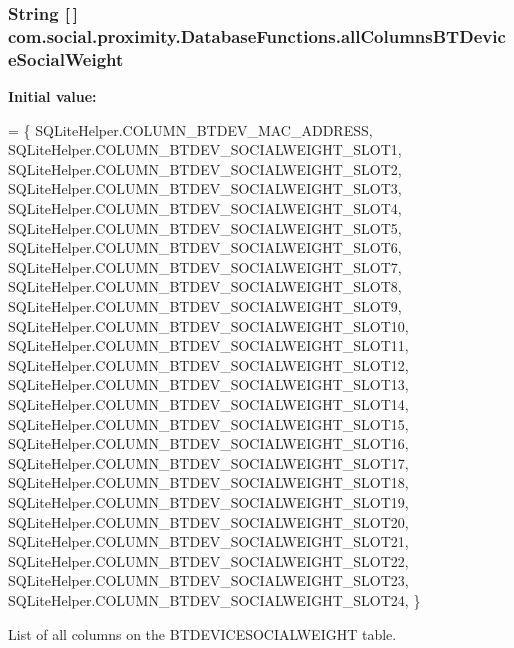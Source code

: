 \subsubsection[{all\+Columns\+B\+T\+Device\+Social\+Weight}]{\setlength{\rightskip}{0pt plus 5cm}String \mbox{[}$\,$\mbox{]} com.\+social.\+proximity.\+Database\+Functions.\+all\+Columns\+B\+T\+Device\+Social\+Weight\hspace{0.3cm}{\ttfamily [private]}}\label{classcom_1_1social_1_1proximity_1_1_database_functions_a5cb0795326bc5712e498557e68a2f3e7}
{\bfseries Initial value\+:}
\begin{DoxyCode}
= \{ 
            SQLiteHelper.COLUMN\_BTDEV\_MAC\_ADDRESS,
            SQLiteHelper.COLUMN\_BTDEV\_SOCIALWEIGHT\_SLOT1,
            SQLiteHelper.COLUMN\_BTDEV\_SOCIALWEIGHT\_SLOT2,
            SQLiteHelper.COLUMN\_BTDEV\_SOCIALWEIGHT\_SLOT3,
            SQLiteHelper.COLUMN\_BTDEV\_SOCIALWEIGHT\_SLOT4,
            SQLiteHelper.COLUMN\_BTDEV\_SOCIALWEIGHT\_SLOT5,
            SQLiteHelper.COLUMN\_BTDEV\_SOCIALWEIGHT\_SLOT6,
            SQLiteHelper.COLUMN\_BTDEV\_SOCIALWEIGHT\_SLOT7,
            SQLiteHelper.COLUMN\_BTDEV\_SOCIALWEIGHT\_SLOT8,
            SQLiteHelper.COLUMN\_BTDEV\_SOCIALWEIGHT\_SLOT9,
            SQLiteHelper.COLUMN\_BTDEV\_SOCIALWEIGHT\_SLOT10,
            SQLiteHelper.COLUMN\_BTDEV\_SOCIALWEIGHT\_SLOT11,
            SQLiteHelper.COLUMN\_BTDEV\_SOCIALWEIGHT\_SLOT12,
            SQLiteHelper.COLUMN\_BTDEV\_SOCIALWEIGHT\_SLOT13,
            SQLiteHelper.COLUMN\_BTDEV\_SOCIALWEIGHT\_SLOT14,
            SQLiteHelper.COLUMN\_BTDEV\_SOCIALWEIGHT\_SLOT15,
            SQLiteHelper.COLUMN\_BTDEV\_SOCIALWEIGHT\_SLOT16,
            SQLiteHelper.COLUMN\_BTDEV\_SOCIALWEIGHT\_SLOT17,
            SQLiteHelper.COLUMN\_BTDEV\_SOCIALWEIGHT\_SLOT18,
            SQLiteHelper.COLUMN\_BTDEV\_SOCIALWEIGHT\_SLOT19,
            SQLiteHelper.COLUMN\_BTDEV\_SOCIALWEIGHT\_SLOT20,
            SQLiteHelper.COLUMN\_BTDEV\_SOCIALWEIGHT\_SLOT21,
            SQLiteHelper.COLUMN\_BTDEV\_SOCIALWEIGHT\_SLOT22,
            SQLiteHelper.COLUMN\_BTDEV\_SOCIALWEIGHT\_SLOT23,
            SQLiteHelper.COLUMN\_BTDEV\_SOCIALWEIGHT\_SLOT24,
    \}
\end{DoxyCode}
List of all columns on the B\+T\+D\+E\+V\+I\+C\+E\+S\+O\+C\+I\+A\+L\+W\+E\+I\+G\+H\+T table. \hypertarget{classcom_1_1social_1_1proximity_1_1_database_functions_a6b12c0a8d4be24df06fbc5117840e2e1}{}
